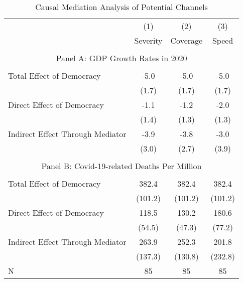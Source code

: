 \begin{table}[!htbp] \centering 
  \caption{Causal Mediation Analysis of Potential Channels} 
  \label{tab:causal-mediation} 
  \begin{threeparttable}
\begin{tabular}{l*{3}{c}}
\hline\hline
                &\multicolumn{1}{c}{(1)}         &\multicolumn{1}{c}{(2)}         &\multicolumn{1}{c}{(3)}         \\
                &     Severity         &     Coverage        &    Speed       \\
\hline  \\[-1.8ex]
\multicolumn{4}{c}{Panel A: GDP Growth Rates in 2020} \\  \\

Total Effect of Democracy  &     -5.0\sym{**} &    -5.0\sym{**} &     -5.0\sym{**} \\
                &    (1.7)         &     (1.7)         &    (1.7)         \\
Direct Effect of Democracy      &     -1.1         &     -1.2         &     -2.0         \\
                &    (1.4)         &     (1.3)         &    (1.3)         \\
Indirect Effect Through Mediator    &     -3.9         &     -3.8         &     -3.0         \\
                &    (3.0)         &    (2.7)         &    (3.9)         \\
                
\hline \\[-1.8ex]

\multicolumn{4}{c}{Panel B: Covid-19-related Deaths Per Million} \\  \\
        
Total Effect of Democracy        &    382.4\sym{***}&    382.4\sym{***}&    382.4\sym{***}\\
                &  (101.2)         &  (101.2)         &     (101.2)         \\

Direct Effect of Democracy    &    118.5\sym{*}  &    130.2\sym{**} &    180.6\sym{*}  \\
                &   (54.5)         &   (47.3)         &    (77.2)         \\

Indirect Effect Through Mediator      &    263.9         &    252.3         &    201.8         \\
                &  (137.3)         &  (130.8)         &  (232.8)         \\    
\hline
N     &     85         &       85         &       85         \\



\end{tabular}
\end{threeparttable}
\end{table}
